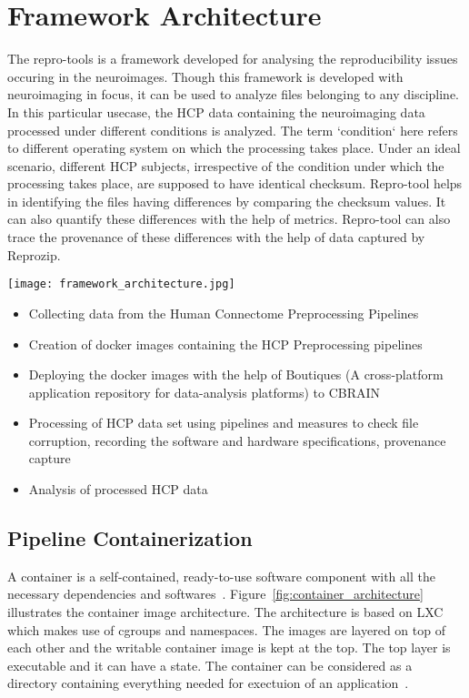 \chapter{Framework Architecture}
The repro-tools  is a framework developed for analysing the reproducibility issues occuring in the neuroimages. Though this framework is developed with neuroimaging in focus, it can be used to analyze files belonging to any discipline. In this particular usecase, the HCP data containing the neuroimaging data processed under different conditions is analyzed. The term `condition` here refers to different operating system on which the processing takes place. Under an ideal scenario, different HCP subjects, irrespective of the condition under which the processing takes place, are supposed to have identical checksum. Repro-tool helps in identifying the files having differences by comparing the checksum values. It can also quantify these differences with the help of metrics. Repro-tool can also trace the provenance of these differences with the help of data captured by Reprozip.

\begin{center}
\texttt{[image: framework\_architecture.jpg]}
\label{fig:framework_architecture}
\end{center}

  \begin{itemize}
  \item Collecting data from the Human Connectome Preprocessing Pipelines~\cite{DBHumanConnectome}
  \item Creation of docker images containing the HCP Preprocessing pipelines
  \item Deploying the docker images with the help of Boutiques (A cross-platform application repository for data-analysis platforms) to CBRAIN
  \item Processing of HCP data set using pipelines and measures to check file corruption, recording the software and hardware specifications, provenance capture
  \item Analysis of processed HCP data
  \end{itemize}

\section{Pipeline Containerization}
A container is a self-contained, ready-to-use software component with all the necessary dependencies and softwares~\cite{7158965}. Figure~\ref{fig:container_architecture} illustrates the container image architecture. The architecture is based on LXC which makes use of  cgroups and namespaces. The images are layered on top of each other and the writable container image is kept at the top. The top layer is executable and it can have a state. The container can be considered as a directory containing everything needed for exectuion of an application~\cite{7158965}.\\

